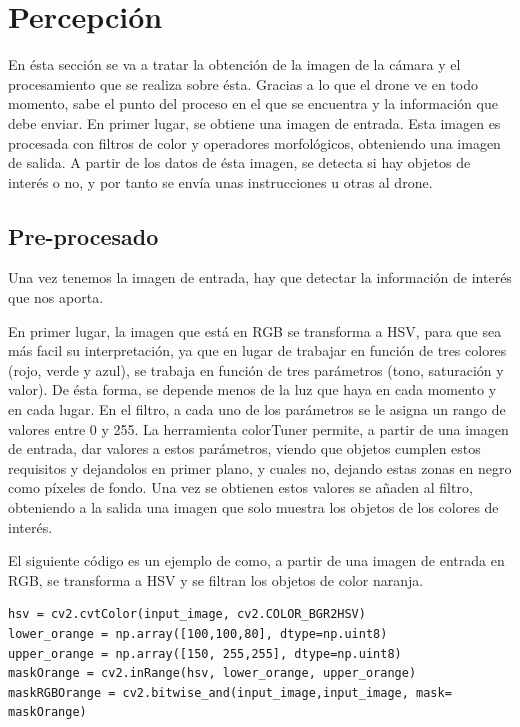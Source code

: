 \section{Percepci\'on}

\hspace{1 cm} En \'esta secci\'on se va a tratar la obtenci\'on de la imagen de la c\'amara y el procesamiento que se realiza sobre \'esta. Gracias a lo que el drone ve en todo momento, sabe el punto del proceso en el que se encuentra y la informaci\'on que debe enviar. En primer lugar, se obtiene una imagen de entrada. Esta imagen es procesada con filtros de color y operadores morfol\'ogicos, obteniendo una imagen de salida. A partir de los datos de \'esta imagen, se detecta si hay objetos de inter\'es o no, y por tanto se env\'ia unas instrucciones u otras al drone. 


\subsection{Pre-procesado}

\hspace{1 cm} Una vez tenemos la imagen de entrada, hay que detectar la informaci\'on de inter\'es que nos aporta. 
 
\hspace{1 cm} En primer lugar, la imagen que est\'a en RGB se transforma a HSV, para que sea m\'as facil su interpretaci\'on, ya que en lugar de trabajar en funci\'on de tres colores (rojo, verde y azul), se trabaja en funci\'on de tres par\'ametros (tono, saturaci\'on y valor). De \'esta forma, se depende menos de la luz que haya en cada momento y en cada lugar. En el filtro, a cada uno de los par\'ametros se le asigna un rango de valores entre 0 y 255. La herramienta colorTuner permite, a partir de una imagen de entrada, dar valores a estos par\'ametros, viendo que objetos cumplen estos requisitos y dejandolos en primer plano, y cuales no, dejando estas zonas en negro como p\'ixeles de fondo. Una vez se obtienen estos valores se añaden al filtro, obteniendo a la salida una imagen que solo muestra los objetos de los colores de inter\'es. 

\hspace{1 cm} El siguiente c\'odigo es un ejemplo de como, a partir de una imagen de entrada en RGB, se transforma a HSV y se filtran los objetos de color naranja. 

\begin{lstlisting}[backgroundcolor=\color{yellow}]
hsv = cv2.cvtColor(input_image, cv2.COLOR_BGR2HSV)
lower_orange = np.array([100,100,80], dtype=np.uint8)
upper_orange = np.array([150, 255,255], dtype=np.uint8)
maskOrange = cv2.inRange(hsv, lower_orange, upper_orange)
maskRGBOrange = cv2.bitwise_and(input_image,input_image, mask= maskOrange)
\end{lstlisting}


